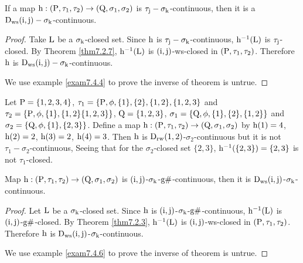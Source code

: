 \begin{thm}\label{thm7.4.3}
If a map $\mathrm{h} :(\mathrm{P}, \tau_1, \tau_2 )\to (\mathrm{Q}, \sigma_{1}, \sigma_{2} )$ is $\tau_{\mathrm{j}}-\sigma_{\mathrm{k}}$-continuous, then it is a $\mathrm{D}_{\mathrm{ws}} (\mathrm{i}, \mathrm{j})-\sigma_{\mathrm{k}}$-continuous.
\end{thm}

\begin{proof}
Take $\mathrm{L}$ be a $\sigma_{\mathrm{k}}$-closed set. Since $\mathrm{h}$ is $\tau_{\mathrm{j}}-\sigma_{\mathrm{k}}$-continuous, $\mathrm{h}^{-1} (\mathrm{L})$ is $\tau_{\mathrm{j}}$-closed. By Theorem \ref{thm7.2.7}, $\mathrm{h}^{-1} (\mathrm{L})$ is $(\mathrm{i}, \mathrm{j})$-ws-closed in $(\mathrm{P}, \tau_1, \tau_2 )$. Therefore $\mathrm{h}$ is $\mathrm{D}_{\mathrm{ws}}(\mathrm{i}, \mathrm{j})-\sigma_{\mathrm{k}}$-continuous.

We use example \ref{exam7.4.4} to prove the inverse of theorem is untrue.
\end{proof}

\begin{exm}\label{exma7.4.4}
Let $\mathrm{P}=\{1, 2, 3, 4\}$, $\tau_1 =\{\mathrm{P}, \phi, \{1\},\{2\},\{1,2\},\{1,2,3\}$ and $\tau_2 =\{\mathrm{P}, \phi, \{1\},\{1, 2\}\{1,2, 3\}\}$, $\mathrm{Q}=\{1, 2, 3\}$, $\sigma_{1} =\{\mathrm{Q}, \phi, \{1\},\{2\},\{1,2\}\}$ and $\sigma_{2} =\{\mathrm{Q}, \phi, \{1\},\{2,3\}\}$. Define a map $\mathrm{h}: (\mathrm{P},\tau_1, \tau_2 )\to (\mathrm{Q}, \sigma_{1}, \sigma_{2} )$ by $\mathrm{h}(1)=4$, $\mathrm{h}(2)=2$, $\mathrm{h}(3)=2$, $\mathrm{h}(4)=3$. Then $\mathrm{h}$ is $\mathrm{D}_{\mathrm{rw}}(1, 2)$-$\sigma_{2}$-continuous but it is not $\tau_1-\sigma_{2}$-continuous, Seeing that for the $\sigma_{2}$-closed set $\{2,3\}$, $\mathrm{h}^{-1}(\{2,3\})=\{2, 3\}$ is not $\tau_1$-closed.
\end{exm}

\begin{thm}\label{thm7.4.5}
Map $\mathrm{h}: (\mathrm{P}, \tau_1, \tau_2 )\to (\mathrm{Q}, \sigma_{1}, \sigma_{2} )$ is $(\mathrm{i}, \mathrm{j})$-$\sigma_{\mathrm{k}}$-$\mathrm{g}\#$-continuous, then it is $\mathrm{D}_{\mathrm{ws}} (\mathrm{i}, \mathrm{j})$-$\sigma_{\mathrm{k}}$-continuous.
\end{thm}

\begin{proof}
Let $\mathrm{L}$ be a $\sigma_{\mathrm{k}}$-closed set. Since $\mathrm{h}$ is $(\mathrm{i}, \mathrm{j})$-$\sigma_{\mathrm{k}}$-$\mathrm{g}\#$-continuous, $\mathrm{h}^{-1}(\mathrm{L})$ is $(\mathrm{i}, \mathrm{j})$-$\mathrm{g}\#$-closed. By Theorem \ref{thm7.2.3}, $\mathrm{h}^{-1}(\mathrm{L})$ is $(\mathrm{i}, \mathrm{j})$-ws-closed in $(\mathrm{P}, \tau_1, \tau_2 )$. Therefore $\mathrm{h}$ is $\mathrm{D}_{\mathrm{ws}} (\mathrm{i}, \mathrm{j})$-$\sigma_{\mathrm{k}}$-continuous.

We use example \ref{exam7.4.6} to prove the inverse of theorem is untrue.
\end{proof}

